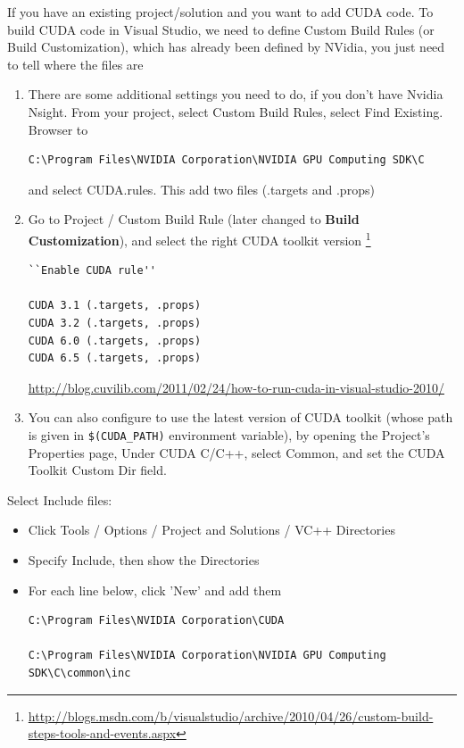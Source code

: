 If you have an existing project/solution and you want to add CUDA code.
To build CUDA code in Visual Studio, we need to define Custom Build Rules (or
Build Customization), which has already been defined by NVidia, you just need to
tell where the files are
\begin{enumerate}
  \item There are some additional settings you need to do, if you don't
  have Nvidia Nsight. From your project, select Custom Build Rules, select Find
  Existing. Browser to
\begin{verbatim}
C:\Program Files\NVIDIA Corporation\NVIDIA GPU Computing SDK\C
\end{verbatim}
and select CUDA.rules. This add two files (.targets and .props)

   \item Go to Project / Custom Build Rule (later changed to {\bf Build
   Customization}), and select the right CUDA toolkit version
   \footnote{\url{http://blogs.msdn.com/b/visualstudio/archive/2010/04/26/custom-build-steps-tools-and-events.aspx}}
\begin{verbatim}
``Enable CUDA rule''

CUDA 3.1 (.targets, .props)
CUDA 3.2 (.targets, .props)
CUDA 6.0 (.targets, .props)
CUDA 6.5 (.targets, .props)
\end{verbatim}
\url{http://blog.cuvilib.com/2011/02/24/how-to-run-cuda-in-visual-studio-2010/}

   \item You can also configure to use the latest version of CUDA toolkit
   (whose path is given in \verb!$(CUDA_PATH)! environment variable), by opening
   the Project's Properties page, Under CUDA C/C++, select Common, and set the
   CUDA Toolkit Custom Dir field.
\end{enumerate}

Select Include files:
\begin{itemize}
  \item Click Tools / Options / Project and Solutions / VC++ Directories
  \item Specify Include, then show the Directories
  \item For each line below, click 'New' and add them 
\begin{verbatim}
C:\Program Files\NVIDIA Corporation\CUDA

C:\Program Files\NVIDIA Corporation\NVIDIA GPU Computing SDK\C\common\inc
\end{verbatim}
\end{itemize} 



